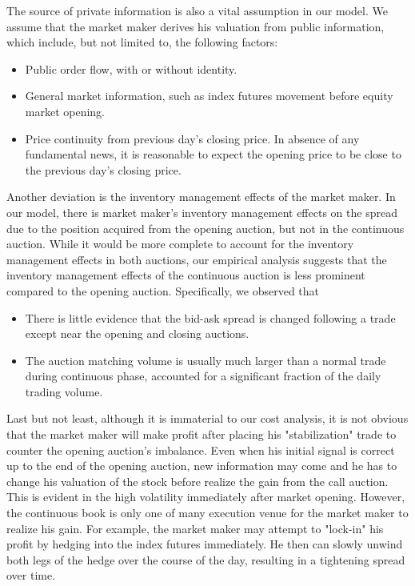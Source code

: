 \documentclass{article}
\begin{document}
The source of private information is also a vital assumption in our model. We assume that the market maker derives his valuation from public information, which include, but not limited to, the following factors:
\begin{itemize}
  \item Public order flow, with or without identity.
  \item General market information, such as index futures movement before equity market opening. 
  \item Price continuity from previous day's closing price. In absence of any fundamental news, it is reasonable to expect the opening price to be close to the previous day's closing price.
\end{itemize}

Another deviation is the inventory management effects of the market maker. In our model, there is market maker's inventory management effects on the spread due to the position acquired from the opening auction, but not in the continuous auction. While it would be more complete to account for the inventory management effects in both auctions, our empirical analysis suggests that the inventory management effects of the continuous auction is less prominent compared to the opening auction. Specifically, we observed that
\begin{itemize}
  \item There is little evidence that the bid-ask spread is changed following a trade except near the opening and closing auctions.
  \item The auction matching volume is usually much larger than a normal trade during continuous phase, accounted for a significant fraction of the daily trading volume.
\end{itemize}

Last but not least, although it is immaterial to our cost analysis, it is not obvious that the market maker will make profit after placing his "stabilization" trade to counter the opening auction's imbalance. Even when his initial signal is correct up to the end of the opening auction, new information may come and he has to change his valuation of the stock before realize the gain from the call auction. This is evident in the high volatility immediately after market opening. However, the continuous book is only one of many execution venue for the market maker to realize his gain. For example, the market maker may attempt to "lock-in" his profit by hedging into the index futures immediately. He then can slowly unwind both legs of the hedge over the course of the day, resulting in a tightening spread over time. 
\end{document}
